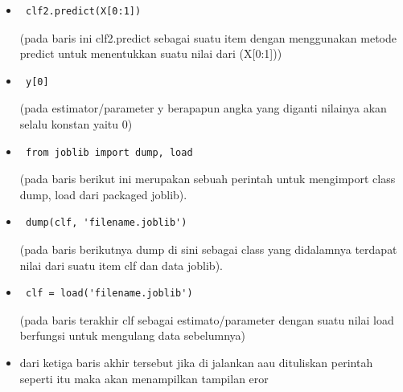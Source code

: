 \begin{itemize}
\item\begin{verbatim} clf2.predict(X[0:1])\end{verbatim}(pada baris ini clf2.predict sebagai suatu item dengan menggunakan metode predict untuk menentukkan suatu nilai dari (X[0:1])) 
\item\begin{verbatim} y[0]\end{verbatim}(pada estimator/parameter y berapapun angka yang diganti nilainya akan selalu konstan yaitu 0)
\item\begin{verbatim} from joblib import dump, load\end{verbatim}(pada baris berikut ini merupakan sebuah perintah untuk mengimport class dump, load dari packaged joblib).
\item\begin{verbatim} dump(clf, 'filename.joblib')\end{verbatim}(pada baris berikutnya dump di sini sebagai class yang didalamnya terdapat nilai dari suatu item clf dan data joblib).
\item\begin{verbatim} clf = load('filename.joblib')\end{verbatim}(pada baris terakhir clf sebagai estimato/parameter dengan suatu nilai load berfungsi untuk mengulang data sebelumnya)
\item dari ketiga baris akhir tersebut jika di jalankan aau dituliskan perintah seperti itu maka akan menampilkan tampilan eror 
\end{itemize}

